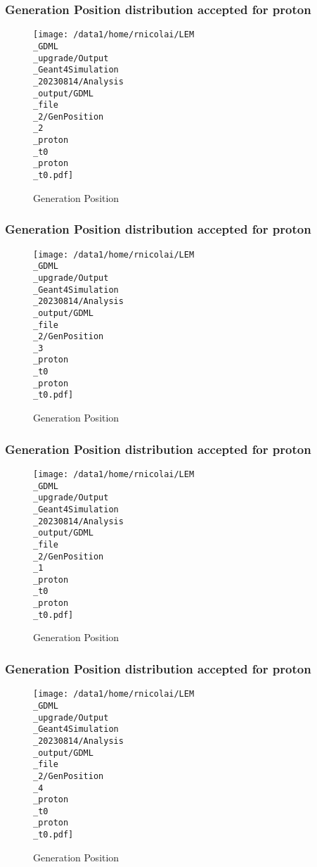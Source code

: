 \documentclass[8pt]{beamer}
\begin{document}
            \begin{frame}
                \frametitle{Generation Position distribution accepted for proton}
            
        \begin{figure}[h]
            \centering
            \texttt{[image: /data1/home/rnicolai/LEM\\\_GDML\\\_upgrade/Output\\\_Geant4Simulation\\\_20230814/Analysis\\\_output/GDML\\\_file\\\_2/GenPosition\\\_2\\\_proton\\\_t0\\\_proton\\\_t0.pdf]}
            \caption{Generation Position}
        \end{figure}
        
            \end{frame}
            
            \begin{frame}
                \frametitle{Generation Position distribution accepted for proton}
            
        \begin{figure}[h]
            \centering
            \texttt{[image: /data1/home/rnicolai/LEM\\\_GDML\\\_upgrade/Output\\\_Geant4Simulation\\\_20230814/Analysis\\\_output/GDML\\\_file\\\_2/GenPosition\\\_3\\\_proton\\\_t0\\\_proton\\\_t0.pdf]}
            \caption{Generation Position}
        \end{figure}
        
            \end{frame}
            
            \begin{frame}
                \frametitle{Generation Position distribution accepted for proton}
            
        \begin{figure}[h]
            \centering
            \texttt{[image: /data1/home/rnicolai/LEM\\\_GDML\\\_upgrade/Output\\\_Geant4Simulation\\\_20230814/Analysis\\\_output/GDML\\\_file\\\_2/GenPosition\\\_1\\\_proton\\\_t0\\\_proton\\\_t0.pdf]}
            \caption{Generation Position}
        \end{figure}
        
            \end{frame}
            
            \begin{frame}
                \frametitle{Generation Position distribution accepted for proton}
            
        \begin{figure}[h]
            \centering
            \texttt{[image: /data1/home/rnicolai/LEM\\\_GDML\\\_upgrade/Output\\\_Geant4Simulation\\\_20230814/Analysis\\\_output/GDML\\\_file\\\_2/GenPosition\\\_4\\\_proton\\\_t0\\\_proton\\\_t0.pdf]}
            \caption{Generation Position}
        \end{figure}
        
            \end{frame}
            
\end{document}

